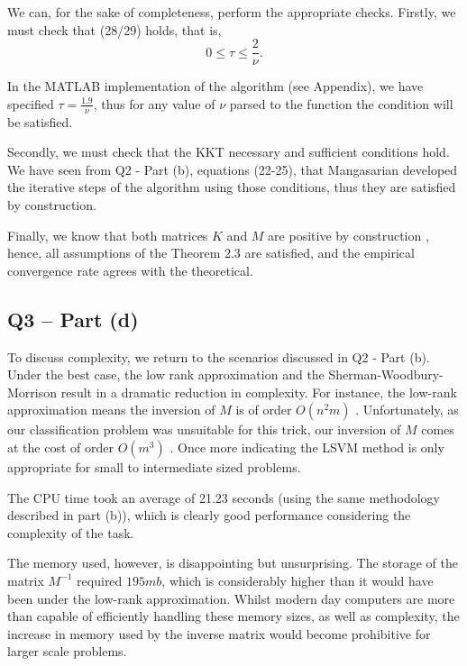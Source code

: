 \documentclass{article}
\begin{document}
We can, for the sake of completeness, perform the appropriate checks. Firstly, we must check that (28/29) holds, that is,
\begin{equation}
    0 \leq \tau \leq \frac{2}{\nu}.
\end{equation}

In the MATLAB implementation of the algorithm (see Appendix), we have specified $\tau = \frac{1.9}{\nu}$, thus for any value of $\nu$ parsed to the function the condition will be satisfied. \par

Secondly, we must check that the KKT necessary and sufficient conditions hold. We have seen from Q2 - Part (b), equations (22-25), that Mangasarian \cite{mangasarian1994nonlinear} developed the iterative steps of the algorithm using those conditions, thus they are satisfied by construction. \par

Finally, we know that both matrices $K$ and $M$ are positive by construction \cite{scholkopf2002learning:ch10}, hence, all assumptions of the Theorem 2.3 are satisfied, and the empirical convergence rate agrees with the theoretical.

\subsection*{Q3 – Part (d)}
To discuss complexity, we return to the scenarios discussed in Q2 - Part (b). Under the best case, the low rank approximation and the Sherman-Woodbury-Morrison result in a dramatic reduction in complexity. For instance, the low-rank approximation means the inversion of $M$ is of order $O(n^{2}m)$ \cite{scholkopf2002learning:ch10}. Unfortunately, as our classification problem was unsuitable for this trick, our inversion of $M$ comes at the cost of order $O(m^3)$ \cite{scholkopf2002learning:ch10}. Once more indicating the LSVM method is only appropriate for small to intermediate sized problems. \par

The CPU time took an average of 21.23 seconds (using the same methodology described in part (b)), which is clearly good performance considering the complexity of the task. \par

The memory used, however, is disappointing but unsurprising. The storage of the matrix $M^{-1}$ required $195mb$, which is considerably higher than it would have been under the low-rank approximation. Whilst modern day computers are more than capable of efficiently handling these memory sizes, as well as complexity, the increase in memory used by the inverse matrix would become prohibitive for larger scale problems. 
\end{document}
